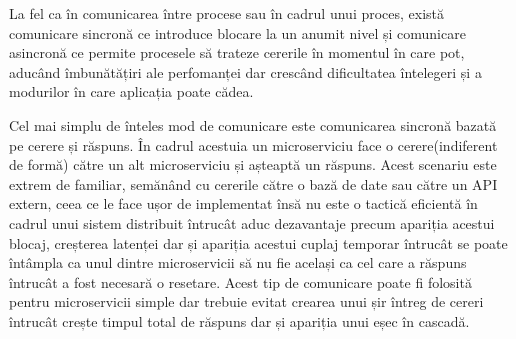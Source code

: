 La fel ca în comunicarea între procese sau în cadrul unui proces, există comunicare sincronă
ce introduce blocare la un anumit nivel și comunicare asincronă ce permite procesele să 
trateze cererile în momentul în care pot, aducând îmbunătățiri ale perfomanței dar crescând
dificultatea întelegeri și a modurilor în care aplicația poate cădea.

Cel mai simplu de înteles mod de comunicare este comunicarea sincronă bazată pe cerere și răspuns.
În cadrul acestuia un microserviciu face o cerere(indiferent de formă) către un alt microserviciu și așteaptă
un răspuns. Acest scenariu este extrem de familiar, semănând cu cererile către o bază de date sau către
un API extern, ceea ce le face ușor de implementat însă nu este o tactică eficientă în cadrul unui sistem distribuit
întrucât aduc dezavantaje precum apariția acestui blocaj, creșterea latenței dar și apariția
acestui cuplaj temporar întrucât se poate întâmpla ca unul dintre microservicii să nu fie același
ca cel care a răspuns întrucât a fost necesară o resetare. Acest tip de comunicare poate fi folosită
pentru microservicii simple dar trebuie evitat crearea unui șir întreg de cereri întrucât crește
timpul total de răspuns dar și apariția unui eșec în cascadă.